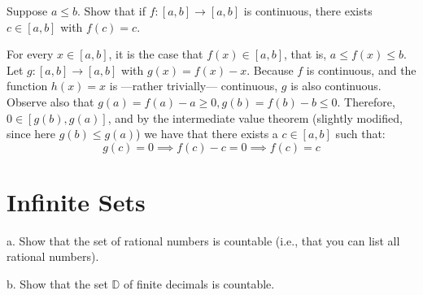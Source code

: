 \begin{exercise}{3}
    Suppose $a \leq b$. Show that if $f : [a, b] \rightarrow [a, b]$ is continuous, there exists $c \in [a, b]$ with $f(c) = c$.
\end{exercise}

\begin{solution}

    For every $x \in [a, b]$, it is the case that $f(x) \in [a,b]$, that is, $a \leq f(x) \leq b$. Let $g:[a, b] \rightarrow [a,b]$ with $g(x) = f(x) -x $. Because $f$ is continuous, and the function $h(x)=x$ is ---rather trivially--- continuous, $g$ is also continuous. 
    Observe also that $g(a) = f(a) - a \geq 0, g(b) = f(b) -b \leq 0$. Therefore, $0 \in [g(b), g(a)]$, and by the intermediate value theorem (slightly modified, since here $g(b) \leq g(a)$) we have that there exists a $c \in [a, b]$ such that:
    $$g(c) = 0 \implies f(c) - c = 0 \implies f(c) = c$$
\end{solution}

\section{Infinite Sets}

\begin{exercise}{1}
    a. Show that the set of rational numbers is countable (i.e., that you can list all rational numbers).

    b. Show that the set $\mathbb{D}$ of finite decimals is countable.
\end{exercise}

